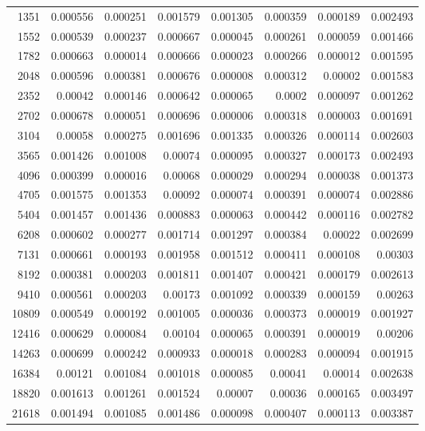 \begin{longtable}{r r r r r r r r}
1351 & 0.000556 & 0.000251 & 0.001579 & 0.001305 & 0.000359 & 0.000189 & 0.002493 \\
1552 & 0.000539 & 0.000237 & 0.000667 & 0.000045 & 0.000261 & 0.000059 & 0.001466 \\
1782 & 0.000663 & 0.000014 & 0.000666 & 0.000023 & 0.000266 & 0.000012 & 0.001595 \\
2048 & 0.000596 & 0.000381 & 0.000676 & 0.000008 & 0.000312 & 0.00002 & 0.001583 \\
2352 & 0.00042 & 0.000146 & 0.000642 & 0.000065 & 0.0002 & 0.000097 & 0.001262 \\
2702 & 0.000678 & 0.000051 & 0.000696 & 0.000006 & 0.000318 & 0.000003 & 0.001691 \\
3104 & 0.00058 & 0.000275 & 0.001696 & 0.001335 & 0.000326 & 0.000114 & 0.002603 \\
3565 & 0.001426 & 0.001008 & 0.00074 & 0.000095 & 0.000327 & 0.000173 & 0.002493 \\
4096 & 0.000399 & 0.000016 & 0.00068 & 0.000029 & 0.000294 & 0.000038 & 0.001373 \\
4705 & 0.001575 & 0.001353 & 0.00092 & 0.000074 & 0.000391 & 0.000074 & 0.002886 \\
5404 & 0.001457 & 0.001436 & 0.000883 & 0.000063 & 0.000442 & 0.000116 & 0.002782 \\
6208 & 0.000602 & 0.000277 & 0.001714 & 0.001297 & 0.000384 & 0.00022 & 0.002699 \\
7131 & 0.000661 & 0.000193 & 0.001958 & 0.001512 & 0.000411 & 0.000108 & 0.00303 \\
8192 & 0.000381 & 0.000203 & 0.001811 & 0.001407 & 0.000421 & 0.000179 & 0.002613 \\
9410 & 0.000561 & 0.000203 & 0.00173 & 0.001092 & 0.000339 & 0.000159 & 0.00263 \\
10809 & 0.000549 & 0.000192 & 0.001005 & 0.000036 & 0.000373 & 0.000019 & 0.001927 \\
12416 & 0.000629 & 0.000084 & 0.00104 & 0.000065 & 0.000391 & 0.000019 & 0.00206 \\
14263 & 0.000699 & 0.000242 & 0.000933 & 0.000018 & 0.000283 & 0.000094 & 0.001915 \\
16384 & 0.00121 & 0.001084 & 0.001018 & 0.000085 & 0.00041 & 0.00014 & 0.002638 \\
18820 & 0.001613 & 0.001261 & 0.001524 & 0.00007 & 0.00036 & 0.000165 & 0.003497 \\
21618 & 0.001494 & 0.001085 & 0.001486 & 0.000098 & 0.000407 & 0.000113 & 0.003387 \\

\end{longtable}
